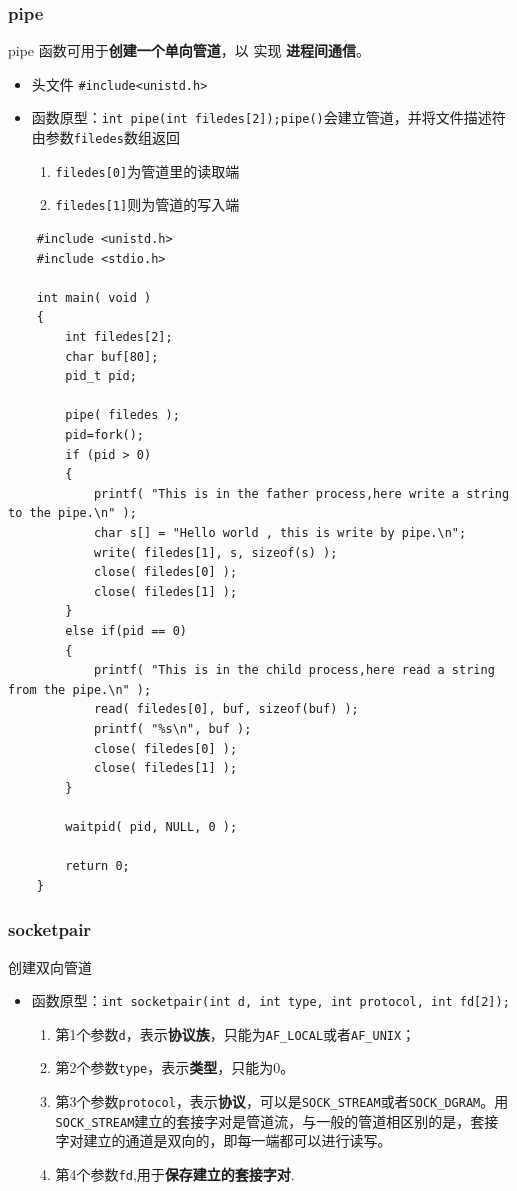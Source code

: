 \documentclass[UTF8,a4paper,8pt]{ctexbook}
\begin{document}
			\subsubsection{pipe}
				pipe 函数可用于\textbf{创建一个单向管道}，以 实现 \textbf{进程间通信}。
			
				\begin{itemize}
					\item 头文件 \verb|#include<unistd.h>|
					\item 函数原型：\verb|int pipe(int filedes[2]);|\verb|pipe()|会建立管道，并将文件描述符由参数\verb|filedes|数组返回
						\begin{enumerate}
							\item  \verb|filedes[0]|为管道里的读取端
							\item  \verb|filedes[1]|则为管道的写入端
						\end{enumerate}
				\end{itemize}
				
				\begin{lstlisting}
	#include <unistd.h>  
	#include <stdio.h>  
	
	int main( void )  
	{  
		int filedes[2];  
		char buf[80];  
		pid_t pid;  
		
		pipe( filedes );  
		pid=fork();          
		if (pid > 0)  
		{  
			printf( "This is in the father process,here write a string to the pipe.\n" );  
			char s[] = "Hello world , this is write by pipe.\n";  
			write( filedes[1], s, sizeof(s) );  
			close( filedes[0] );  
			close( filedes[1] );  
		}  
		else if(pid == 0)  
		{  
			printf( "This is in the child process,here read a string from the pipe.\n" );  
			read( filedes[0], buf, sizeof(buf) );  
			printf( "%s\n", buf );  
			close( filedes[0] );  
			close( filedes[1] );  
		}  
		
		waitpid( pid, NULL, 0 );  
		
		return 0;  
	}  
				\end{lstlisting}
			\subsubsection{socketpair}
				创建双向管道
				
				\begin{itemize}
					\item 函数原型：\verb|int socketpair(int d, int type, int protocol, int fd[2]);|   
						\begin{enumerate}
							\item 第1个参数\verb|d|，表示\textbf{协议族}，只能为\verb|AF_LOCAL|或者\verb|AF_UNIX|；
							\item 第2个参数\verb|type|，表示\textbf{类型}，只能为0。
							\item 第3个参数\verb|protocol|，表示\textbf{协议}，可以是\verb|SOCK_STREAM|或者\verb|SOCK_DGRAM|。用\verb|SOCK_STREAM|建立的套接字对是管道流，与一般的管道相区别的是，套接字对建立的通道是双向的，即每一端都可以进行读写。
							\item 第4个参数\verb|fd|,用于\textbf{保存建立的套接字对}.
						\end{enumerate}
				\end{itemize}
				
\end{document}
